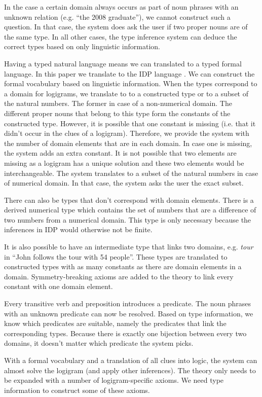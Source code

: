 In the case a certain domain always occurs as part of noun phrases with an unknown relation (e.g. ``the 2008 graduate''), we cannot construct such a question. In that case, the system does ask the user if two proper nouns are of the same type. In all other cases, the type inference system can deduce the correct types based on only linguistic information.

Having a typed natural language means we can translated to a typed formal language. In this paper we translate to the IDP language \cite{IDP}. We can construct the formal vocabulary based on linguistic information. When the types correspond to a domain for logigrams, we translate to to a constructed type or to a subset of the natural numbers. The former in case of a non-numerical domain. The different proper nouns that belong to this type form the constants of the constructed type. However, it is possible that one constant is missing (i.e. that it didn't occur in the clues of a logigram). Therefore, we provide the system with the number of domain elements that are in each domain. In case one is missing, the system adds an extra constant. It is not possible that two elements are missing as a logigram has a unique solution and these two elements would be interchangeable. The system translates to a subset of the natural numbers in case of numerical domain. In that case, the system asks the user the exact subset.

There can also be types that don't correspond with domain elements. There is a derived numerical type which contains the set of numbers that are a difference of two numbers from a numerical domain. This type is only necessary because the inferences in IDP would otherwise not be finite.

It is also possible to have an intermediate type that links two domains, e.g. \textit{tour} in ``John follows the tour with 54 people''. These types are translated to constructed types with as many constants as there are domain elements in a domain. Symmetry-breaking axioms are added to the theory to link every constant with one domain element.

Every transitive verb and preposition introduces a predicate. The noun phrases with an unknown predicate can now be resolved. Based on type information, we know which predicates are suitable, namely the predicates that link the corresponding types. Because there is exactly one bijection between every two domains, it doesn't matter which predicate the system picks.

With a formal vocabulary and a translation of all clues into logic, the system can almost solve the logigram (and apply other inferences). The theory only needs to be expanded with a number of logigram-specific axioms. We need type information to construct some of these axioms. 

